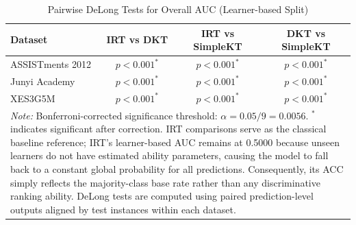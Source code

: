 \begin{table}[htbp]
\caption{Pairwise DeLong Tests for Overall AUC (Learner-based Split)}
\label{tab:delong_overall}
\centering
\scriptsize
\setlength{\tabcolsep}{3pt}
\begin{tabular}{lccc}
\toprule
\textbf{Dataset} & \textbf{IRT vs DKT} & \textbf{IRT vs SimpleKT} & \textbf{DKT vs SimpleKT} \\
\midrule
ASSISTments 2012 & $p < 0.001^{*}$ & $p < 0.001^{*}$ & $p < 0.001^{*}$ \\
Junyi Academy    & $p < 0.001^{*}$ & $p < 0.001^{*}$ & $p < 0.001^{*}$ \\
XES3G5M          & $p < 0.001^{*}$ & $p < 0.001^{*}$ & $p < 0.001^{*}$ \\
\bottomrule
\multicolumn{4}{p{\linewidth}}{\textit{Note:} Bonferroni-corrected significance threshold: $\alpha = 0.05/9 = 0.0056$. $^{*}$ indicates significant after correction. IRT comparisons serve as the classical baseline reference; IRT's learner-based AUC remains at 0.5000 because unseen learners do not have estimated ability parameters, causing the model to fall back to a constant global probability for all predictions. Consequently, its ACC simply reflects the majority-class base rate rather than any discriminative ranking ability. DeLong tests are computed using paired prediction-level outputs aligned by test instances within each dataset.} \\
\end{tabular}
\end{table}
